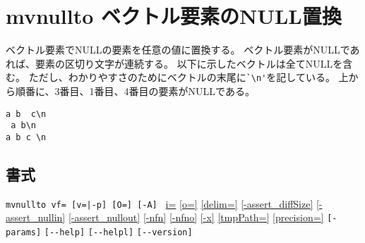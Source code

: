 
%

\section{mvnullto ベクトル要素のNULL置換\label{sect:mvnullto}}
ベクトル要素でNULLの要素を任意の値に置換する。
ベクトル要素がNULLであれば、要素の区切り文字が連続する。
以下に示したベクトルは全てNULLを含む。
ただし、わかりやすさのためにベクトルの末尾に\verb|`\n'|を記している。
上から順番に、3番目、1番目、4番目の要素がNULLである。
\begin{Verbatim}[baselinestretch=0.7,frame=single]
a b  c\n
 a b\n
a b c \n
\end{Verbatim}

\subsection*{書式}
\verb/mvnullto vf= [v=|-p] [O=] [-A] /
\hyperref[sect:option_i]{i=}
\hyperref[sect:option_o]{[o=]}
\hyperref[sect:option_delim]{[delim=]} 
\hyperref[sect:option_assert_diffSize]{[-assert\_diffSize]}
\hyperref[sect:option_assert_nullin]{[-assert\_nullin]}
\hyperref[sect:option_assert_nullout]{[-assert\_nullout]}
\hyperref[sect:option_nfn]{[-nfn]} 
\hyperref[sect:option_nfno]{[-nfno]}  
\hyperref[sect:option_x]{[-x]}
\hyperref[sect:option_option_tmppath]{[tmpPath=]}
\hyperref[sect:option_precision]{[precision=]}
\verb|[-params]|
\verb|[--help]|
\verb|[--helpl]|
\verb|[--version]|\\

